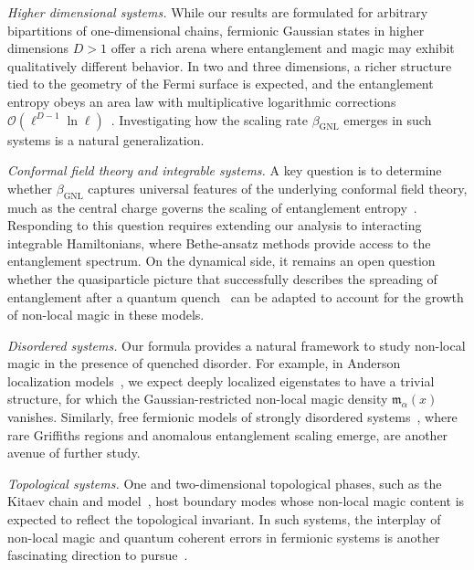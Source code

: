 \documentclass[prx,twocolumn,superscriptaddress,aps,10pt, frontmatterverbose, reprint,footinbib,longbibliography=true]{revtex4-2}
\newcommand{\RENYI}{\alpha}
\begin{document}
\emph{Higher dimensional systems.}
While our results are formulated for arbitrary bipartitions of one-dimensional chains, fermionic Gaussian states in higher dimensions $D>1$ offer a rich arena where entanglement and magic may exhibit qualitatively different behavior. In two and three dimensions, a richer structure tied to the geometry of the Fermi surface is expected, and the entanglement entropy obeys an area law with multiplicative logarithmic corrections $\mathcal{O}(\ell^{D-1}\ln\ell)$~\cite{swingle2010entanglement}. 
Investigating how the scaling rate $\beta_\mathrm{GNL}$ emerges in such systems is a natural generalization.


\emph{Conformal field theory and integrable systems.}
A key question is to determine whether $\beta_{\mathrm{GNL}}$ captures universal features of the underlying conformal field theory, much as the central charge governs the scaling of entanglement entropy~\cite{Calabrese2004entanglement}.
Responding to this question requires extending our analysis to interacting integrable Hamiltonians, where Bethe-ansatz methods provide access to the entanglement spectrum.
On the dynamical side, it remains an open question whether the quasiparticle picture that successfully describes the spreading of entanglement after a quantum quench~\cite{Alba_2017,alba2019,Kudler_Flam_2021} can be adapted to account for the growth of non-local magic in these models.

\emph{Disordered systems.}
Our formula provides a natural framework to study non-local magic in the presence of quenched disorder. 
For example, in Anderson localization models~\cite{evers,sierant2020}, we expect deeply localized eigenstates to have a trivial structure, for which the Gaussian-restricted non-local magic density $\mathfrak{m}_\RENYI(x)$ vanishes. 
Similarly, free fermionic models of strongly disordered systems~\cite{IGLOI_2005,Monthus_2018,ruggiero2022}, where rare Griffiths regions and anomalous entanglement scaling emerge, are another avenue of further study.

\emph{Topological systems.}
One and two-dimensional topological phases, such as the Kitaev chain and model~\cite{Kitaev2001chain,Kitaev_2006}, host boundary modes whose non-local magic content is expected to reflect the topological invariant.
In such systems, the interplay of non-local magic and quantum coherent errors in fermionic systems is another fascinating direction to pursue~\cite{beri,gskb-t5ql}.
\end{document}
